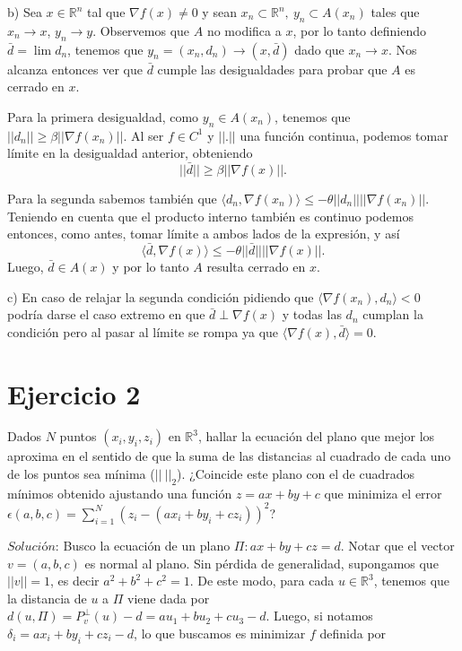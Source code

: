 \documentclass[12pt]{article}
\begin{document}
\bigskip
\bigskip
b) Sea $x \in \mathbb{R}^n$ tal que $\nabla f(x) \neq 0$ y sean $x_n \subset \mathbb{R}^n, \ y_n \subset A(x_n)$ tales que $x_n \rightarrow x$, $y_n \rightarrow y$. Observemos que $A$ no modifica a $x$, por lo tanto definiendo $\bar{d} = \lim d_n$, tenemos que $y_n = (x_n, d_n) \rightarrow (x, \bar{d})$ dado que $x_n \rightarrow x$. Nos alcanza entonces ver que $\bar{d}$ cumple las desigualdades para probar que $A$ es cerrado en $x$.

\bigskip
Para la primera desigualdad, como $y_n \in A(x_n)$, tenemos que $||d_n|| \geq \beta ||\nabla f(x_n)||$. Al ser $f \in C^1$ y $||.||$ una función continua, podemos tomar límite en la desigualdad anterior, obteniendo 
\[ ||\bar{d}|| \geq \beta ||\nabla f(x)||. \]

\bigskip
Para la segunda sabemos también que $ \langle d_n, \nabla f(x_n) \rangle \leq -\theta ||d_n|| ||\nabla f(x_n)||$. Teniendo en cuenta que el producto interno también es continuo podemos entonces, como antes, tomar límite a ambos lados de la expresión, y así
\[ \langle \bar{d}, \nabla f(x) \rangle \leq -\theta ||\bar{d}|| ||\nabla f(x)||. \]
Luego, $\bar{d} \in A(x)$ y por lo tanto $A$ resulta cerrado en $x$.

\bigskip
\bigskip
c) En caso de relajar la segunda condición pidiendo que $\langle \nabla f(x_n), d_n \rangle < 0$ podría darse el caso extremo en que $\bar{d} \perp \nabla f(x)$ y todas las $d_n$ cumplan la condición pero al pasar al límite se rompa ya que $\langle \nabla f(x), \bar{d} \rangle = 0.$

\bigskip
\section*{Ejercicio 2}
Dados $N$ puntos $(x_i, y_i, z_i)$ en $\mathbb{R}^3$, hallar la ecuación del plano que mejor los aproxima en el sentido de que la suma de las distancias al cuadrado de cada uno de los puntos sea mínima ($||\ ||_2$). ¿Coincide este plano con el de cuadrados mínimos obtenido ajustando una función $z = ax + by + c$ que minimiza el error $\epsilon(a,b,c) = \sum_{i=1}^N (z_i-(ax_i+by_i+cz_i))^2$?

\bigskip
$\textit{Solución:}$ Busco la ecuación de un plano $\Pi : ax + by + cz = d$. Notar que el vector $v = (a, b, c)$ es normal al plano. Sin pérdida de generalidad, supongamos que $||v|| = 1$, es decir $a^2+b^2+c^2 = 1.$ De este modo, para cada $u \in \mathbb{R}^3$, tenemos que la distancia de $u$ a $\Pi$ viene dada por $d(u, \Pi) = P^{\perp}_v (u) - d = au_1 + bu_2 + cu_3 - d.$
Luego, si notamos $\delta_i = ax_i + by_i + cz_i - d$, lo que buscamos es minimizar $f$ definida por
\end{document}
